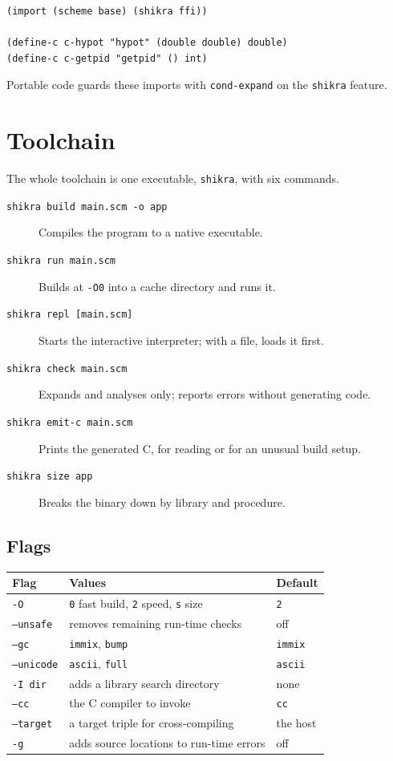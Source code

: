 \documentclass[a4paper,11pt]{article}
\begin{document}
\begin{verbatim}
(import (scheme base) (shikra ffi))

(define-c c-hypot "hypot" (double double) double)
(define-c c-getpid "getpid" () int)
\end{verbatim}

Portable code guards these imports with \texttt{cond-expand} on the
\texttt{shikra} feature.

\section{Toolchain}

The whole toolchain is one executable, \texttt{shikra}, with six commands.

\begin{description}
\item[\texttt{shikra build main.scm -o app}] Compiles the program to a
  native executable.
\item[\texttt{shikra run main.scm}] Builds at \texttt{-O0} into a cache
  directory and runs it.
\item[\texttt{shikra repl [main.scm]}] Starts the interactive interpreter;
  with a file, loads it first.
\item[\texttt{shikra check main.scm}] Expands and analyses only; reports
  errors without generating code.
\item[\texttt{shikra emit-c main.scm}] Prints the generated C, for reading
  or for an unusual build setup.
\item[\texttt{shikra size app}] Breaks the binary down by library and
  procedure.
\end{description}

\subsection{Flags}

\begin{center}
\begin{tabular}{lll}
\hline
Flag & Values & Default \\
\hline
\texttt{-O} & \texttt{0} fast build, \texttt{2} speed, \texttt{s} size & \texttt{2} \\
\texttt{--unsafe} & removes remaining run-time checks & off \\
\texttt{--gc} & \texttt{immix}, \texttt{bump} & \texttt{immix} \\
\texttt{--unicode} & \texttt{ascii}, \texttt{full} & \texttt{ascii} \\
\texttt{-I dir} & adds a library search directory & none \\
\texttt{--cc} & the C compiler to invoke & \texttt{cc} \\
\texttt{--target} & a target triple for cross-compiling & the host \\
\texttt{-g} & adds source locations to run-time errors & off \\
\hline
\end{tabular}
\end{center}
\end{document}
